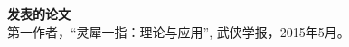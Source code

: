 
	\begin{flushleft} {\bfseries\large 发表的论文}\\ \relax
		[1] 第一作者，“灵犀一指：理论与应用”, 武侠学报，2015年5月。\\
	\end{flushleft}
